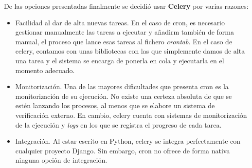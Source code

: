 De las opciones presentadas finalmente se decidió usar \textbf{Celery} por
varias razones:

\begin{itemize}
\item Facilidad al dar de alta nuevas tareas. En el caso de cron, es necesario
  gestionar manualmente las tareas a ejecutar y añadirm también de forma manual,
  el proceso que lance esas tareas al fichero \textit{crontab}. En el caso de
  celery, contamos con unas bibliotecas con las que simplemente damos de alta
  una tarea y el sistema se encarga de ponerla en cola y ejecutarla en el
  momento adecuado.

\item Monitorización. Una de las mayores dificultades que presenta cron es la
  monitorización de su ejecución. No existe una certeza absoluta de que se estén
  lanzando los procesos, al menos que se elabore un sistema de verificación
  externo. En cambio, celery cuenta con sistemas de monitorización de la
  ejecución y \textit{logs} en los que se registra el progreso de cada tarea.

\item Integración. Al estar escrito en Python, celery se integra perfectamente
  con cualquier proyecto Django. Sin embargo, cron no ofrece de forma nativa
  ninguna opción de integración.

\end{itemize}

